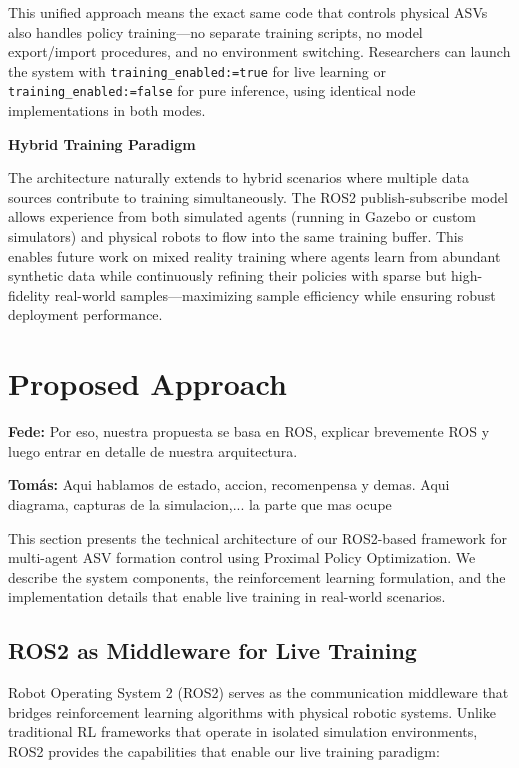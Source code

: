 \documentclass[preprint,3p]{elsarticle}
\newcommand{\fcom}[1]{{ \color{orange}\textbf{Fede:} #1}}
\newcommand{\tcom}[1]{{ \color{blue}\textbf{Tomás:} #1}}
\begin{document}
This unified approach means the exact same code that controls physical ASVs also handles policy training—no separate training scripts, no model export/import procedures, and no environment switching. Researchers can launch the system with \texttt{training\_enabled:=true} for live learning or \texttt{training\_enabled:=false} for pure inference, using identical node implementations in both modes.

\vspace{0.5em}

\textbf{Hybrid Training Paradigm}

The architecture naturally extends to hybrid scenarios where multiple data sources contribute to training simultaneously. The ROS2 publish-subscribe model allows experience from both simulated agents (running in Gazebo or custom simulators) and physical robots to flow into the same training buffer. This enables future work on mixed reality training where agents learn from abundant synthetic data while continuously refining their policies with sparse but high-fidelity real-world samples—maximizing sample efficiency while ensuring robust deployment performance.



\section{Proposed Approach}
\label{proposed}
\fcom{Por eso, nuestra propuesta se basa en ROS, explicar brevemente ROS y luego entrar en detalle de nuestra arquitectura.}

\tcom{Aqui hablamos de estado, accion, recomenpensa y demas. Aqui diagrama, capturas de la simulacion,... la parte que mas ocupe }

This section presents the technical architecture of our ROS2-based framework for multi-agent ASV formation control using Proximal Policy Optimization. We describe the system components, the reinforcement learning formulation, and the implementation details that enable live training in real-world scenarios.

\subsection{ROS2 as Middleware for Live Training}

Robot Operating System 2 (ROS2) serves as the communication middleware that bridges reinforcement learning algorithms with physical robotic systems. Unlike traditional RL frameworks that operate in isolated simulation environments, ROS2 provides the capabilities that enable our live training paradigm:
\end{document}
